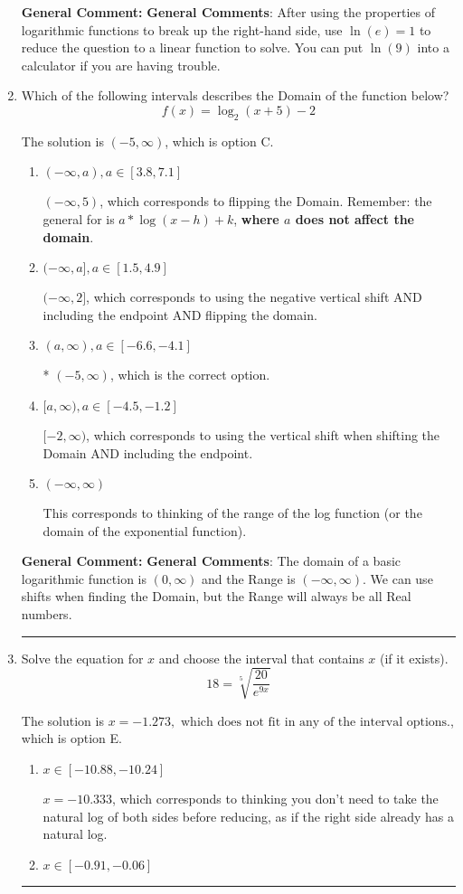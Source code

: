\documentclass{extbook}[14pt]
\newcommand{\litem}[1]{\item #1

\rule{\textwidth}{0.4pt}}
\begin{document}
\begin{enumerate}
{\textbf{General Comment:} \textbf{General Comments}: After using the properties of logarithmic functions to break up the right-hand side, use $\ln(e) = 1$ to reduce the question to a linear function to solve. You can put $\ln(9)$ into a calculator if you are having trouble.
}
\litem{
Which of the following intervals describes the Domain of the function below?
\[ f(x) = \log_2{(x+5)}-2 \]

The solution is \( (-5, \infty) \), which is option C.\begin{enumerate}[label=\Alph*.]
\item \( (-\infty, a), a \in [3.8, 7.1] \)

$(-\infty, 5)$, which corresponds to flipping the Domain. Remember: the general for is $a*\log(x-h)+k$, \textbf{where $a$ does not affect the domain}.
\item \( (-\infty, a], a \in [1.5, 4.9] \)

$(-\infty, 2]$, which corresponds to using the negative vertical shift AND including the endpoint AND flipping the domain.
\item \( (a, \infty), a \in [-6.6, -4.1] \)

* $(-5, \infty)$, which is the correct option.
\item \( [a, \infty), a \in [-4.5, -1.2] \)

$[-2, \infty)$, which corresponds to using the vertical shift when shifting the Domain AND including the endpoint.
\item \( (-\infty, \infty) \)

This corresponds to thinking of the range of the log function (or the domain of the exponential function).
\end{enumerate}

\textbf{General Comment:} \textbf{General Comments}: The domain of a basic logarithmic function is $(0, \infty)$ and the Range is $(-\infty, \infty)$. We can use shifts when finding the Domain, but the Range will always be all Real numbers.
}
\litem{
 Solve the equation for $x$ and choose the interval that contains $x$ (if it exists).
\[  18 = \sqrt[5]{\frac{20}{e^{9x}}} \]

The solution is \( x = -1.273, \text{ which does not fit in any of the interval options.} \), which is option E.\begin{enumerate}[label=\Alph*.]
\item \( x \in [-10.88, -10.24] \)

$x = -10.333$, which corresponds to thinking you don't need to take the natural log of both sides before reducing, as if the right side already has a natural log.
\item \( x \in [-0.91, -0.06] \)


\end{enumerate}}
\end{enumerate}
\end{document}
